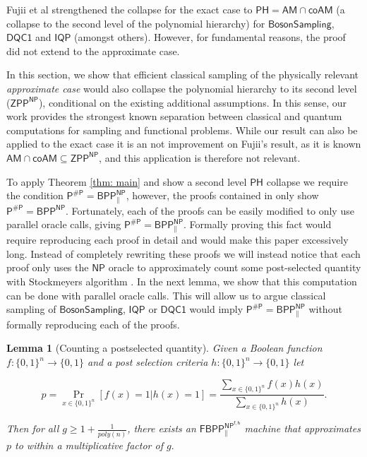 \documentclass{article}
\newtheorem{lemma}[theorem]{Lemma}
\begin{document}
Fujii \cite{fujii2015power} et al strengthened the collapse for the exact case to $\mathsf{PH = AM \cap coAM}$ (a collapse to the second level of the polynomial hierarchy) for $\mathsf{BosonSampling}$, $\mathsf{DQC1}$ and $\mathsf{IQP}$ (amongst others). However, for fundamental reasons, the proof did not extend to the approximate case.

In this section, we show that efficient classical sampling of the physically relevant \textit{approximate case} would also collapse the polynomial hierarchy to its second level ($\mathsf{ZPP^{NP}}$), conditional on the existing additional assumptions. In this sense, our work provides the strongest known separation between classical and quantum computations for sampling and functional problems. While our result can also be applied to the exact case it is an not improvement on Fujii's result, as it is known $\mathsf{AM\cap coAM \subseteq ZPP^{NP}}$, and this application is therefore not relevant.

To apply Theorem \ref{thm: main} and show a second level $\mathsf{PH}$ collapse we require the condition $\mathsf{P^{\#P}=BPP^{NP}_{\parallel}}$, however, the proofs contained in \cite{aaronson2011computational, bremner2016average, morimae2017hardness} only show $\mathsf{P^{\#P}=BPP^{NP}}$. 
Fortunately, each of the proofs can be easily modified to only use parallel oracle calls, giving $\mathsf{P^{\#P}=BPP^{NP}_{\parallel}}$. 
Formally proving this fact would require reproducing each proof in detail and would make this paper excessively long.
Instead of completely rewriting these proofs we will instead notice that each proof only uses the $\mathsf{NP}$ oracle to approximately count some post-selected quantity with Stockmeyers algorithm \cite{stockmeyer1985approximation}. 
In the next lemma, we show that this computation can be done with parallel oracle calls. This will allow us to argue classical sampling of $\mathsf{BosonSampling}$, $\mathsf{IQP}$ or $\mathsf{DQC1}$ would imply $\mathsf{P^{\#P}=BPP^{NP}_{\parallel}}$ without formally reproducing each of the proofs.

\begin{lemma}[Counting a postselected quantity]\label{lma: postselected stockmeyer}
    Given a Boolean function $f:\{0,1\}^n\rightarrow \{0,1\}$ and a post selection criteria $h:\{0,1\}^n\rightarrow \{0,1\}$ let
    
    \[
    p=\Pr_{x\in \{0,1\}^n}[f(x)=1| h(x)=1]
    =\frac{\sum_{x\in \{ 0 ,1 \}^n}f(x)h(x)}{\sum_{x\in \{ 0 ,1 \}^n}h(x)}
    .
    \]
    
    Then for all $g\geq 1+ \frac{1}{poly(n)}$, there exists an $\mathsf{FBPP_{\parallel}^{NP^{f,h}}}$ machine that approximates $p$ to within a multiplicative factor of $g.$
\end{lemma}
\end{document}
